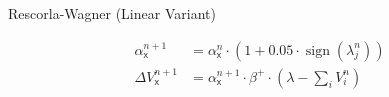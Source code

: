 \documentclass[varwidth]{standalone}
\begin{document}
\begin{center}
	\huge
	\sffamily
	Rescorla-Wagner (Linear Variant)
\end{center}
\newcommand{\eks}{\textsf{x}}
\begin{equation*}
	\begin{aligned}
		\alpha_\eks^{n + 1} &= \alpha_\eks^n \cdot (1 + 0.05 \cdot \operatorname{sign}(\lambda_j^n)) \\
		\Delta V_{\eks}^{n+1} &= \alpha_\eks^{n + 1} \cdot \beta^+ \cdot \left( \lambda - \textstyle\sum_i V_i^{n} \right)
	\end{aligned}
	\label{linear_alpha}
\end{equation*}
\end{document}
